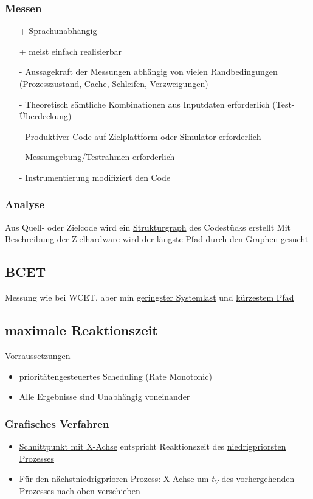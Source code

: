 \subsubsection{Messen}
\begin{itemize}
	\item[+] Sprachunabhängig
	\item[+] meist einfach realisierbar \\
	\item[-] Aussagekraft der Messungen abhängig von vielen Randbedingungen (Prozesszustand, Cache, Schleifen, Verzweigungen)
	\item[-] Theoretisch sämtliche Kombinationen aus Inputdaten erforderlich
(Test-Überdeckung)
	\item[-] Produktiver Code auf Zielplattform oder Simulator erforderlich
	\item[-] Messumgebung/Testrahmen erforderlich
	\item[-] Instrumentierung modifiziert den Code
\end{itemize}

\subsubsection{Analyse}
Aus Quell- oder Zielcode wird ein \underline{Strukturgraph} des Codestücks erstellt
Mit Beschreibung der Zielhardware wird der \underline{längste Pfad} durch den Graphen
gesucht

\subsection{BCET}
Messung wie bei WCET, aber min \underline{geringster Systemlast} und \underline{kürzestem Pfad}

\subsection{maximale Reaktionszeit}
Vorraussetzungen
\begin{itemize}
	\item prioritätengesteuertes Scheduling (Rate Monotonic)
	\item Alle Ergebnisse sind Unabhängig voneinander
\end{itemize}

\subsubsection{Grafisches Verfahren}
\begin{itemize}
	\item \underline{Schnittpunkt mit X-Achse} entspricht Reaktionszeit des \underline{niedrigpriorsten Prozesses}
	\item Für den \underline{nächstniedrigprioren Prozess}: X-Achse um $t_V$ des vorhergehenden Prozesses nach oben verschieben
\end{itemize}

